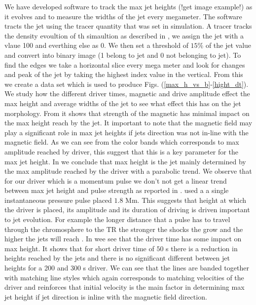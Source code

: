 \par We have developed software to track the max jet heights (!get image example!) as it evolves and to measure the widths of the jet every megameter. The software tracts the jet using the tracer quantity that was set in simulation. A tracer tracks the density evoultion of th simaultion as described in \cite{Porth_2014}, we assign the jet with a vlaue 100 and everthing else as 0. We then set a threshold of $15\%$ of the jet value and convert into binary image (1 belong to jet and 0 not belonging to jet). To find the edges we take a horizontal slice every mega meter and look for changes and peak of the jet by taking the highest index value in the vertical. From this we create a data set which is used to produce Figs. (\ref{max_h_vs_b}-\ref{hight_dt}). We study how the different driver times, magnetic and drive amplitude effect the max height and average widths of the jet to see what effect this has on the jet morphology. From  it shows that strength of the magnetic has minimal impact on the max height reach by the jet. It important to note that the magnetic field may play a significant role in max jet heights if jets direction was not in-line with the magnetic field. As we can see from the color bands which corresponds to max amplitude reached by driver, this suggest that this is a key parameter for the max jet height. In  we conclude that max height is the jet mainly determined by the max amplitude reached by the driver with a parabolic trend. We observe that for our driver which is a momentum pulse we don't not get a linear trend between max jet height and pulse strength as reported in \cite{Singh2019}. \cite{Singh2019} used a a single instantaneous pressure pulse placed $1.8$ Mm. This suggests that height at which the driver is placed, its amplitude and its duration of driving is driven important to jet evolution. For example the longer distance that a pulse has to travel through the chromosphere to the TR the stronger the shocks the grow and the higher the jets will reach \citep{Shibata1982}. In  wee see that the driver time has some impact on max height. It shows that for short driver time of $50$ s there is a reduction in heights reached by the jets and there is no significant different between jet heights for a 200 and 300 s driver. We can see that the lines are banded together with matching line styles which again corresponds to matching velocities of the driver and reinforces that initial velocity is the main factor in determining max jet height if jet direction is inline with the magnetic field direction.
